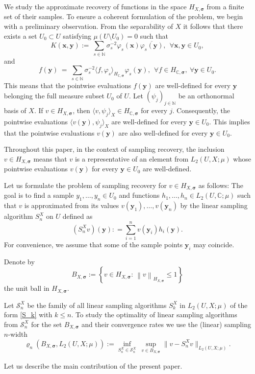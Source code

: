 \documentclass[11pt]{article}
\numberwithin{equation}{section}
\theoremstyle{definition}
\theoremstyle{remark}
\newcommand{\brac}[1]{\left(#1\right)}
\newcommand{\brab}[1]{\left\{#1\right\}}
\newcommand{\norm}[2]{\left\|{#1}\right\|_{#2}}
\newcommand{\bx}{{\boldsymbol{x}}}
\newcommand{\by}{{\boldsymbol{y}}}
\newcommand{\bsigma}{{\boldsymbol{\sigma}}}
\def\NN{{\mathbb N}}
\def\CC{{\mathbb C}}
\def\CC{{\mathbb C}}
\def\NN{{\mathbb N}}
\def\Ss{{\mathcal S}}
\def\CC{{\mathbb C}}
\def\NN{{\mathbb N}}
\begin{document}
{We study the approximate recovery of functions in the space $H_{X,\bsigma}$
	from a finite set of their samples. To ensure a coherent formulation of the problem, we begin with a preliminary observation.
	From the separability of $X$ it follows that there exists  a set $U_0 \subset U$ satisfying  $\mu(U\setminus U_0)=0$
such that
\begin{equation} \nonumber
	K(\bx,\by)
	:= \
	\sum_{s \in \NN} \sigma_s^{-2} \varphi_s(\bx)\overline{\varphi_s(\by)}, \ \ \forall \bx, \by \in U_0,
\end{equation}
and
\begin{equation} \nonumber
	f(\by)
	\ = \
	\sum_{s \in \NN} 
	\sigma_s^{-2}
	\langle f,\varphi_s \rangle_{H_{\CC,\bsigma}}
	\varphi_s(\by), \ \ 
    \forall  f \in H_{\CC,\bsigma},  \ \forall  \by \in U_0.
\end{equation}
This means that the pointwise evaluations $f(\by)$ are well-defined for every $\by$ belonging the full measure subset $U_0$ of $U$. 
Let $\brac{\psi_j}_{j \in \NN}$ be an orthonormal basis of  $X$. 
If $v \in H_{X,\bsigma}$, then $\langle v,\psi_j \rangle_X \in H_{\CC,\bsigma}$ for every $j$. 
Consequently, the pointwise evaluations $\langle v(\by),\psi_j \rangle_X $ are well-defined for every
$\by \in U_0$. This implies that the pointwise evaluations  $v(\by)$ are also well-defined for every
$\by \in U_0$.

Throughout this paper, in the context of sampling recovery,  the inclusion $v \in H_{X,\bsigma}$
means that $v$ is a representative of an element from $L_2(U,X;\mu)$ whose pointwise evaluations $v(\by)$ for every
$\by \in U_0$ are well-defined.
 
Let us  formulate the problem of  sampling recovery for 
 $v \in H_{X,\bsigma}$ as follows:
The goal is to find a sample $y_1,\dots,y_n\in U_0$ and functions $h_1, \dots,h_n\in L_2(U,\CC;\mu)$ such that $v$ is approximated from its values $v(\by_1),\ldots, v(\by_n)$ by the linear sampling algorithm $S_n^X$ on $U$ defined as
\begin{equation} \label{S_k}
	(S_n^X v)(\by): = \sum_{i=1}^n v(\by_i) h_i(\by).
\end{equation}
For convenience, we assume that some of the sample points $\by_i$ may coincide. 

    Denote by
\begin{equation*} \label{B_X^q}
	B_{X,\bsigma}:= \brab{v \in H_{X,\bsigma}: \, \norm{v}{H_{X,\bsigma}} \le 1}
\end{equation*}
the unit ball in $H_{X,\bsigma}$.

Let $\Ss_n^X$ be the family of all linear sampling algorithms 
$S_k^X$ in $L_2(U,X;\mu)$ of the form \eqref{S_k} with $k \le n$.
 To study the optimality of linear sampling algorithms from 
 $\Ss_n^X$ for the set $B_{X,\bsigma}$ 
 and their convergence rates we use the (linear) sampling $n$-width
\begin{equation*} \label{rho_n}
	\varrho_n(B_{X,\bsigma}, L_2(U,X;\mu)) :=\inf_{S_n^X \in \Ss_n^X} \ \sup_{v\in B_{X,\bsigma}} 
	\|v - S_n^X v\|_{L_2(U,X;\mu)}.
\end{equation*}


Let us describe the main contribution of the present paper.}
\end{document}

